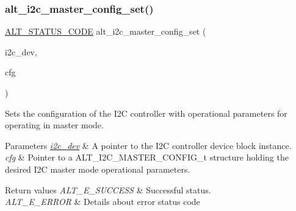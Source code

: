 \subsubsection{\texorpdfstring{alt\_i2c\_master\_config\_set()}{alt\_i2c\_master\_config\_set()}}
{\footnotesize\ttfamily \mbox{\hyperlink{hwlib_8h_abdb0d369f069723ca55d6c94bcaaaa12}{A\+L\+T\+\_\+\+S\+T\+A\+T\+U\+S\+\_\+\+C\+O\+DE}} alt\+\_\+i2c\+\_\+master\+\_\+config\+\_\+set (\begin{DoxyParamCaption}\item[{\mbox{\hyperlink{structALT__I2C__DEV__s}{A\+L\+T\+\_\+\+I2\+C\+\_\+\+D\+E\+V\+\_\+t}} $\ast$}]{i2c\+\_\+dev,  }\item[{const \mbox{\hyperlink{group__ALT__I2C_ga4f317dbba3080bb537f6c145ca30d503}{A\+L\+T\+\_\+\+I2\+C\+\_\+\+M\+A\+S\+T\+E\+R\+\_\+\+C\+O\+N\+F\+I\+G\+\_\+t}} $\ast$}]{cfg }\end{DoxyParamCaption})}

Sets the configuration of the I2C controller with operational parameters for operating in master mode.


\begin{DoxyParams}{Parameters}
{\em \mbox{\hyperlink{structi2c__dev}{i2c\+\_\+dev}}} & A pointer to the I2C controller device block instance.\\
\hline
{\em cfg} & Pointer to a A\+L\+T\+\_\+\+I2\+C\+\_\+\+M\+A\+S\+T\+E\+R\+\_\+\+C\+O\+N\+F\+I\+G\+\_\+t structure holding the desired I2C master mode operational parameters.\\
\hline
\end{DoxyParams}

\begin{DoxyRetVals}{Return values}
{\em A\+L\+T\+\_\+\+E\+\_\+\+S\+U\+C\+C\+E\+SS} & Successful status. \\
\hline
{\em A\+L\+T\+\_\+\+E\+\_\+\+E\+R\+R\+OR} & Details about error status code \\
\hline
\end{DoxyRetVals}
\mbox{\label{group__ALT__I2C_ga90d8a89d7b447bede11a9c1c79ea3b99}} 
